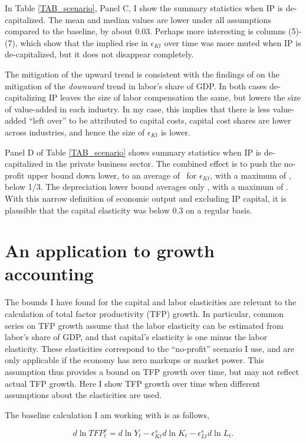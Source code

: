 \documentclass[11pt]{article}
\begin{document}
In Table \ref{TAB_scenario}, Panel C, I show the summary statistics when IP is de-capitalized. The mean and median values are lower under all assumptions compared to the baseline, by about 0.03. Perhaps more interesting is columns (5)-(7), which show that the implied rise in $\epsilon_{Kt}$ over time was more muted when IP is de-capitalized, but it does not disappear completely. 

The mitigation of the upward trend is consistent with the findings of \cite{ksz2020} on the mitigation of the \textit{downward} trend in labor's share of GDP. In both cases de-capitalizing IP leaves the size of labor compensation the same, but lowers the size of value-added in each industry. In my case, this implies that there is less value-added ``left over'' to be attributed to capital costs, capital cost shares are lower across industries, and hence the size of $\epsilon_{Kt}$ is lower. 

Panel D of Table \ref{TAB_scenario} shows summary statistics when IP is de-capitalized in the private business sector. The combined effect is to push the no-profit upper bound down lower, to an average of \exclnoprofit \ for $\epsilon_{Kt}$, with a maximum of \exclmaxnoprofit, below 1/3. The depreciation lower bound averages only \excldepr, with a maximum of \exclmaxdepr. With this narrow definition of economic output and excluding IP capital, it is plausible that the capital elasticity was below 0.3 on a regular basis.

\section{An application to growth accounting}
The bounds I have found for the capital and labor elasticities are relevant to the calculation of total factor productivity (TFP) growth. In particular, common series on TFP growth assume that the labor elasticity can be estimated from labor's share of GDP, and that capital's elasticity is one minus the labor elasticity. These elasticities correspond to the ``no-profit'' scenario I use, and are only applicable if the economy has zero markups or market power. This assumption thus provides a bound on TFP growth over time, but may not reflect actual TFP growth. Here I show TFP growth over time when different assumptions about the elasticities are used. 

The baseline calculation I am working with is as follows,

\begin{equation}
	d \ln TFP^s_t = d \ln Y_t - \epsilon^s_{Kt} d \ln K_t - \epsilon^s_{Lt} d \ln L_t. \label{EQ_accounting}
\end{equation}
\end{document}
